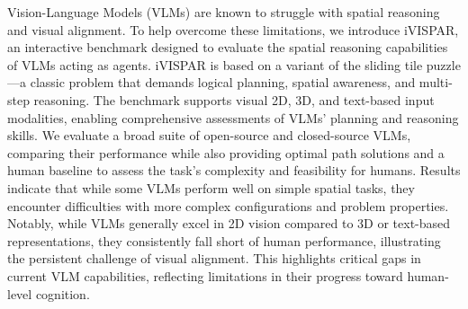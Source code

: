 Vision-Language Models (VLMs) are known to struggle with spatial reasoning and visual alignment. To help overcome these limitations, we introduce iVISPAR, an interactive benchmark designed to evaluate the spatial reasoning capabilities of VLMs acting as agents. iVISPAR is based on a variant of the sliding tile puzzle—a classic problem that demands logical planning, spatial awareness, and multi-step reasoning. The benchmark supports visual 2D, 3D, and text-based input modalities, enabling comprehensive assessments of VLMs' planning and reasoning skills. We evaluate a broad suite of open-source and closed-source VLMs, comparing their performance while also providing optimal path solutions and a human baseline to assess the task's complexity and feasibility for humans. Results indicate that while some VLMs perform well on simple spatial tasks, they encounter difficulties with more complex configurations and problem properties. Notably, while VLMs generally excel in 2D vision compared to 3D or text-based representations, they consistently fall short of human performance, illustrating the persistent challenge of visual alignment. This highlights critical gaps in current VLM capabilities, reflecting limitations in their progress toward human-level cognition.